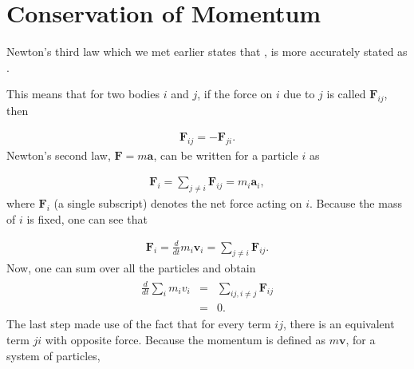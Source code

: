 \documentclass[letterpaper,10pt,english]{sphinxmanual}
\begin{document}
\section{Conservation of Momentum}
\label{\detokenize{chapter1:conservation-of-momentum}}
Newton’s third law which we met earlier states that , is more accurately stated as
.

This means that for two bodies \(i\) and \(j\), if the force on \(i\) due to \(j\) is called \(\boldsymbol{F}_{ij}\), then




\begin{equation*}
\begin{split}
\begin{equation}
\boldsymbol{F}_{ij}=-\boldsymbol{F}_{ji}. 
\label{_auto25} \tag{28}
\end{equation}
\end{split}
\end{equation*}
Newton’s second law, \(\boldsymbol{F}=m\boldsymbol{a}\), can be written for a particle \(i\) as




\begin{equation*}
\begin{split}
\begin{equation}
\boldsymbol{F}_i=\sum_{j\ne i} \boldsymbol{F}_{ij}=m_i\boldsymbol{a}_i,
\label{_auto26} \tag{29}
\end{equation}
\end{split}
\end{equation*}
where \(\boldsymbol{F}_i\) (a single subscript) denotes the net force acting on \(i\). Because the mass of \(i\) is fixed, one can see that




\begin{equation*}
\begin{split}
\begin{equation}
\boldsymbol{F}_i=\frac{d}{dt}m_i\boldsymbol{v}_i=\sum_{j\ne i}\boldsymbol{F}_{ij}.
\label{_auto27} \tag{30}
\end{equation}
\end{split}
\end{equation*}
Now, one can sum over all the particles and obtain
\begin{equation*}
\begin{split}
\begin{eqnarray}
\frac{d}{dt}\sum_i m_iv_i&=&\sum_{ij, i\ne j}\boldsymbol{F}_{ij}\\
\nonumber
&=&0.
\end{eqnarray}
\end{split}
\end{equation*}
The last step made use of the fact that for every term \(ij\), there is
an equivalent term \(ji\) with opposite force. Because the momentum is
defined as \(m\boldsymbol{v}\), for a system of particles,
\end{document}
